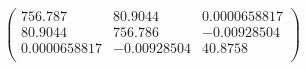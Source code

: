 \documentclass{article}
\begin{document}
\[\left(
\begin{array}{ccc}
 756.787 & 80.9044 & 0.0000658817 \\
 80.9044 & 756.786 & -0.00928504 \\
 0.0000658817 & -0.00928504 & 40.8758 \\
\end{array}
\right)\]
\end{document}

